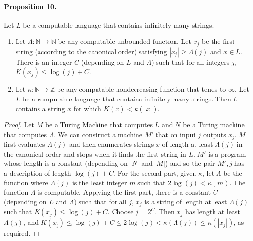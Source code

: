 \paragraph{Proposition 10.}
Let $L$ be a computable language that contains infinitely many strings.
\begin{enumerate}
\item Let $\Lambda:\mathbb N\to\mathbb N$ be any computable unbounded function. Let $x_j$ be the first string (according to the canonical order) satisfying $|x_j|\geq\Lambda(j)$ and $x\in L$. There is an integer $C$ (depending on $L$ and $\Lambda$) such that for all integers $j$, $K(x_j)\leq\log(j)+C$.
\item Let $\kappa:\mathbb N\to\mathbb Z$ be any computable nondecreasing function that tends to $\infty$. Let $L$ be a computable language that contains infinitely many strings. Then $L$ contains a string $x$ for which $K(x)<\kappa(|x|)$.
\end{enumerate}
\begin{proof}
Let $M$ be a Turing Machine that computes $L$ and $N$ be a Turing machine that computes $\Lambda$. We can construct a machine $M'$ that on input $j$ outputs $x_j$. $M$ first evaluates $\Lambda(j)$ and then enumerates strings $x$ of length at least $\Lambda(j)$ in the canonical order and stops when it finds the first string in $L$. $M'$ is a program whose length is a constant (depending on $|N|$ and $|M|$) and so the pair $M',j$ has a description of length $\log(j)+C$.
For the second part, given $\kappa$, let $\Lambda$ be the function where $\Lambda(j)$ is the least integer $m$ such that $2\log(j)<\kappa(m)$. The function $\Lambda$ is computable. Applying the first part, there is a constant $C$ (depending on $L$ and $\Lambda$) such that for all $j$, $x_j$ is a string of length at least $\Lambda(j)$ such that $K(x_j)\leq\log(j)+C$. Choose $j=2^C$. Then $x_j$ has length at least $\Lambda(j)$, and $K(x_j)\leq\log(j)+C\leq2\log(j)<\kappa(\Lambda(j))\leq\kappa(|x_j|)$, as required.
\end{proof}
